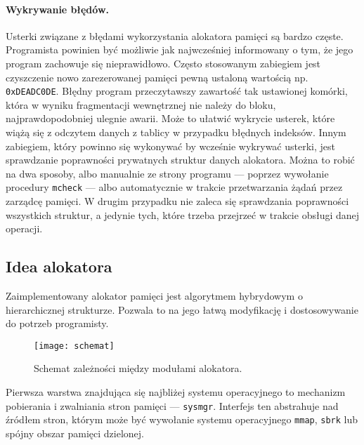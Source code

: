 \documentclass[12pt,a4paper,titlepage,twoside]{mwart}
\begin{document}
\paragraph{Wykrywanie błędów.} Usterki związane z błędami wykorzystania
alokatora pamięci są bardzo częste. Programista powinien być możliwie jak
najwcześniej informowany o tym, że jego program zachowuje się nieprawidłowo.
Często stosowanym zabiegiem jest czyszczenie nowo zarezerowanej pamięci pewną
ustaloną wartością np. \texttt{0xDEADC0DE}. Błędny program przeczytawszy
zawartość tak ustawionej komórki, która w wyniku fragmentacji wewnętrznej nie
należy do bloku, najprawdopodobniej ulegnie awarii. Może to ułatwić wykrycie
usterek, które wiążą się z odczytem danych z tablicy w przypadku błędnych
indeksów. Innym zabiegiem, który powinno się wykonywać by wcześnie wykrywać
usterki, jest sprawdzanie poprawności prywatnych struktur danych alokatora.
Można to robić na dwa sposoby, albo manualnie ze strony programu --- poprzez
wywołanie procedury \texttt{mcheck} --- albo automatycznie w trakcie
przetwarzania żądań przez zarządcę pamięci. W drugim przypadku nie zaleca się
sprawdzania poprawności wszystkich struktur, a jedynie tych, które trzeba
przejrzeć w trakcie obsługi danej operacji.

\subsection{Idea alokatora}

Zaimplementowany alokator pamięci jest algorytmem hybrydowym o hierarchicznej
strukturze. Pozwala to na jego łatwą modyfikację i dostosowywanie do potrzeb
programisty.

\begin{figure}[h]
\centering
\texttt{[image: schemat]}
\caption{Schemat zależności między modułami alokatora.}
\end{figure}

Pierwsza warstwa znajdująca się najbliżej systemu operacyjnego to mechanizm
pobierania i zwalniania stron pamięci --- \texttt{sysmgr}. Interfejs ten
abstrahuje nad źródłem stron, którym może być wywołanie systemu operacyjnego
\texttt{mmap}, \texttt{sbrk} lub spójny obszar pamięci dzielonej.
\end{document}
